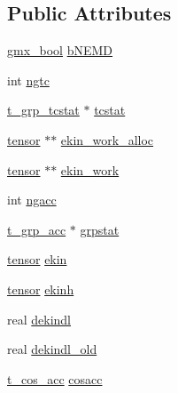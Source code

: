 \subsection*{\-Public \-Attributes}
\begin{DoxyCompactItemize}
\item 
\hyperlink{include_2types_2simple_8h_a8fddad319f226e856400d190198d5151}{gmx\-\_\-bool} \hyperlink{structgmx__ekindata__t_a42a45e46708b83f212e3d3220722ebf6}{b\-N\-E\-M\-D}
\item 
int \hyperlink{structgmx__ekindata__t_a4b812b7a5107e1ffb9f691a490ea11b3}{ngtc}
\item 
\hyperlink{structt__grp__tcstat}{t\-\_\-grp\-\_\-tcstat} $\ast$ \hyperlink{structgmx__ekindata__t_ab6ed89be8fc3034982605b7e3edc8b6d}{tcstat}
\item 
\hyperlink{share_2template_2gromacs_2types_2simple_8h_aef0bf341f56ce75f09dbb64350488a61}{tensor} $\ast$$\ast$ \hyperlink{structgmx__ekindata__t_a66f38ceb36138f50db30d56819a70649}{ekin\-\_\-work\-\_\-alloc}
\item 
\hyperlink{share_2template_2gromacs_2types_2simple_8h_aef0bf341f56ce75f09dbb64350488a61}{tensor} $\ast$$\ast$ \hyperlink{structgmx__ekindata__t_a4b67583614b8460abab06f36793b3e4d}{ekin\-\_\-work}
\item 
int \hyperlink{structgmx__ekindata__t_a753a403d823ad9c389f4889f5ac3c752}{ngacc}
\item 
\hyperlink{structt__grp__acc}{t\-\_\-grp\-\_\-acc} $\ast$ \hyperlink{structgmx__ekindata__t_ac41b57daf7c1d99e70e6fb30fdb1c609}{grpstat}
\item 
\hyperlink{share_2template_2gromacs_2types_2simple_8h_aef0bf341f56ce75f09dbb64350488a61}{tensor} \hyperlink{structgmx__ekindata__t_a8f2a62678c7d0ed77e3fcdf4d9a06345}{ekin}
\item 
\hyperlink{share_2template_2gromacs_2types_2simple_8h_aef0bf341f56ce75f09dbb64350488a61}{tensor} \hyperlink{structgmx__ekindata__t_a75e234dcfb494a9e681e23286d3778e6}{ekinh}
\item 
real \hyperlink{structgmx__ekindata__t_a5b0d5a2184dd326712337bd9621cba05}{dekindl}
\item 
real \hyperlink{structgmx__ekindata__t_ad21aabd45e7b06fdaf1a37eb7b7b2940}{dekindl\-\_\-old}
\item 
\hyperlink{structt__cos__acc}{t\-\_\-cos\-\_\-acc} \hyperlink{structgmx__ekindata__t_a13a2a98251342e5ec34e59779b55a4d7}{cosacc}
\end{DoxyCompactItemize}


